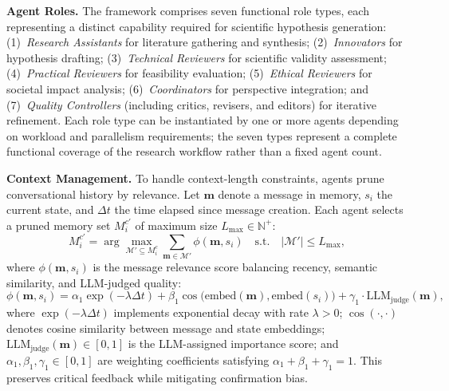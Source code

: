 \documentclass[runningheads]{llncs}
\begin{document}
\textbf{Agent Roles.} The framework comprises seven functional role types, each representing a distinct capability required for scientific hypothesis generation: (1)~\textit{Research Assistants} for literature gathering and synthesis; (2)~\textit{Innovators} for hypothesis drafting; (3)~\textit{Technical Reviewers} for scientific validity assessment; (4)~\textit{Practical Reviewers} for feasibility evaluation; (5)~\textit{Ethical Reviewers} for societal impact analysis; (6)~\textit{Coordinators} for perspective integration; and (7)~\textit{Quality Controllers} (including critics, revisers, and editors) for iterative refinement. Each role type can be instantiated by one or more agents depending on workload and parallelism requirements; the seven types represent a complete functional coverage of the research workflow rather than a fixed agent count.

\textbf{Context Management.} To handle context-length constraints, agents prune conversational history by relevance. Let $\mathbf{m}$ denote a message in memory, $s_i$ the current state, and $\Delta t$ the time elapsed since message creation. Each agent selects a pruned memory set $M_i^{c'}$ of maximum size $L_{\max} \in \mathbb{N}^+$:
\begin{equation}
    M_i^{c'} = \arg\max_{\mathcal{M}' \subseteq M_i^c} \sum_{\mathbf{m} \in \mathcal{M}'} \phi(\mathbf{m}, s_i) \quad \text{s.t.} \quad |\mathcal{M}'| \leq L_{\max},
\end{equation}
where $\phi(\mathbf{m}, s_i)$ is the message relevance score balancing recency, semantic similarity, and LLM-judged quality:
\begin{equation}
    \phi(\mathbf{m}, s_i) = \alpha_1 \exp(-\lambda \Delta t) + \beta_1 \cos\big(\text{embed}(\mathbf{m}), \text{embed}(s_i)\big) + \gamma_1 \cdot \text{LLM}_{\text{judge}}(\mathbf{m}),
\end{equation}
where $\exp(-\lambda \Delta t)$ implements exponential decay with rate $\lambda > 0$; $\cos(\cdot, \cdot)$ denotes cosine similarity between message and state embeddings; $\text{LLM}_{\text{judge}}(\mathbf{m}) \in [0, 1]$ is the LLM-assigned importance score; and $\alpha_1, \beta_1, \gamma_1 \in [0, 1]$ are weighting coefficients satisfying $\alpha_1 + \beta_1 + \gamma_1 = 1$. This preserves critical feedback while mitigating confirmation bias.
\end{document}
